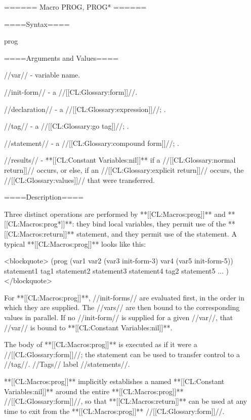 ====== Macro PROG, PROG* ======

====Syntax====

\DefmacWithValuesNewline prog {  } {}

 {  } {}

====Arguments and Values====

//var// - variable name.

//init-form// - a //[[CL:Glossary:form]]//.

//declaration// - a  //[[CL:Glossary:expression]]//; \noeval.

//tag// - a //[[CL:Glossary:go tag]]//; \noeval.

//statement// - a //[[CL:Glossary:compound form]]//; \evalspecial.

//results// - **[[CL:Constant Variables:nil]]** if a //[[CL:Glossary:normal return]]// occurs, or else, if an //[[CL:Glossary:explicit return]]// occurs, the //[[CL:Glossary:values]]// that were transferred.

====Description====

Three distinct operations are performed by **[[CL:Macros:prog]]** and **[[CL:Macros:prog*]]**: they bind local variables, they permit use of the **[[CL:Macros:return]]** statement, and they permit use of the  statement. A typical **[[CL:Macros:prog]]** looks like this:

<blockquote> (prog (var1 var2 (var3 init-form-3) var4 (var5 init-form-5))  statement1 tag1 statement2 statement3 statement4 tag2 statement5 ... ) </blockquote>

For **[[CL:Macros:prog]]**, //init-forms// are evaluated first, in the order in which they are supplied. The //vars// are then bound to the corresponding values in parallel. If no //init-form// is supplied for a given //var//, that //var// is bound to **[[CL:Constant Variables:nil]]**.

The body of **[[CL:Macros:prog]]** is executed as if it were a  //[[CL:Glossary:form]]//; the  statement can be used to transfer control to a //tag//. //Tags// label //statements//.

**[[CL:Macros:prog]]** implicitly establishes a  named **[[CL:Constant Variables:nil]]** around the entire **[[CL:Macros:prog]]** //[[CL:Glossary:form]]//, so that **[[CL:Macros:return]]** can be used at any time to exit from the **[[CL:Macros:prog]]** //[[CL:Glossary:form]]//.

